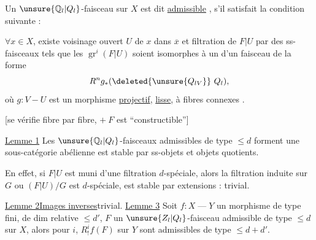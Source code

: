 
Un \(\unsure{\mathbb Q_l|Q_l}\)-faisceau   sur \(X\) est dit
\uline{admissible} , s'il satisfait la condition suivante :

\(\forall x\in X\), existe voisinage ouvert \(U\) de \(x\) dans \(\overline{x}\)
et filtration  de \(F|U\) par des ss-faisceaux
tels que les \(\operatorname{gr}^i(F|U)\) soient isomorphes
à un 
d'un faisceau de la forme
\[
R^ng_*(\deleted{\unsure{Q_{lV}}}\ Q_l),
\]
où \(g:V\mathbin{-}U\) est un morphisme \uline{projectif},
 \uline{lisse}, à fibres connexes .


[se vérifie fibre par fibre, \(+\ F\) est ``constructible'']


\uline{Lemme 1}\quad
Les  \(\unsure{\mathbb Q_l|Q_l}\)-faisceaux admissibles de type \(\le d\)
forment une sous-catégorie abélienne
est stable par ss-objets et objets quotients.

En effet, si \(F|U\) est muni d'une filtration \(d\)-spéciale,
alors la filtration induite sur \(G\) ou \((F|U)/G\) est \(d\)-spéciale,
est stable par extensions : trivial.

\uline{Lemme 2}\quad \uline{Images inverses}\hfill trivial.
\uline{Lemme 3}\quad
Soit \(f:X\mathbin{\text{---}}Y\) un morphisme
 de type fini, de dim relative \(\le d'\),
\(F\) un \(\unsure{Z_l|Q_l}\)-faisceau admissible de type \(\le d\) sur \(X\),
alors pour  \(i\), \(R^i_!f(F)\) sur \(Y\)
sont admissibles de type \(\le d+d'\).

